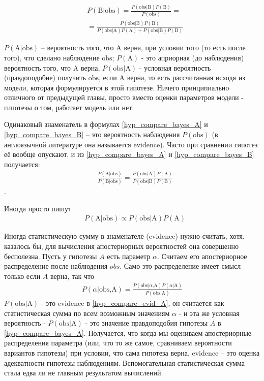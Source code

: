 \documentclass{book}
\begin{document}
\begin{align}\label{hyp_compare_bayes_B}
   &P\left(\text{B|obs}\right)=
   \frac{P\left(\text{obs|B}\right) P\left(\text{B}\right)}{P\left(\text{obs}\right)} = \nonumber \\
   &=\frac{P\left(\text{obs|B}\right) P\left(\text{B}\right)}{P\left(\text{obs|A}\right) P\left(\text{A}\right)+P\left(\text{obs|B}\right) P\left(\text{B}\right)}
\end{align}


$P\left(\text{A|obs}\right)$ -- вероятность того, что $\text{A}$ верна, при условии того (то есть после того), что сделано наблюдение $\text{obs}$; $P\left(\text{A}\right)$ - это априорная (до наблюдения) вероятность того, что $\text{A}$ верна, $P\left(\text{obs|A}\right)$ - условная вероятность (правдоподобие) получить $\text{obs}$, если $\text{A}$ верна, то есть рассчитанная исходя из модели, которая формулируется в этой гипотезе. Ничего принципиально отличного от предыдущей главы, просто вместо оценки параметров модели - гипотезы о том, работает модель или нет.

Одинаковый знаменатель в формулах \eqref{hyp_compare_bayes_A} и \eqref{hyp_compare_bayes_B} -- это вероятность наблюдения $P\left(\text{obs}\right)$ (в англоязычной литературе она называется evidence). Часто при сравнении гипотез её вообще опускают, и из \eqref{hyp_compare_bayes_A} и \eqref{hyp_compare_bayes_B} получается:
\begin{align}\label{hyp_compare_bayes_comp}
   &\frac{P\left(\text{A|obs}\right)}{P\left(\text{B|obs}\right)}=\frac{P\left(\text{obs|A}\right) P\left(\text{A}\right)}{P\left(\text{obs|B}\right) P\left(\text{B}\right)}
\end{align}.

Иногда просто пишут 
\begin{align}\label{hyp_compare_bayes_null_prop}
   &P\left(\text{A|obs}\right)\propto P\left(\text{obs|A}\right) P\left(\text{A}\right)
\end{align}

Иногда \cite{skilling_nested_2006} статистическую сумму в знаменателе (evidence) нужно считать, хотя, казалось бы, для вычисления апостериорных вероятностей она совершенно бесполезна. Пусть у гипотезы $A$ есть параметр $\alpha$. Считаем его апостериорное распределение после наблюдения $obs$. Само это распределение имеет смысл только если $A$ верна, так что 
\begin{align}\label{hyp_compare_evid_A}
   P\left(\alpha\text{|obs,A}\right)=\frac{P\left(\text{obs|}\alpha\text{,A}\right) P\left(\alpha\text{|A}\right)}{P\left(\text{obs|A}\right)}
\end{align}
$P\left(\text{obs|A}\right)$ - это evidence в \eqref{hyp_compare_evid_A}, он считается как статистическая сумма по всем возможным значениям $\alpha$ - и эта же условная вероятность - $P\left(\text{obs|A}\right)$ - это значение правдоподобия гипотезы $A$ в  \eqref{hyp_compare_bayes_A}. Получается, что когда мы оцениваем апостериорные распределения параметра (или, что то же самое, сравниваем вероятности вариантов гипотезы) при условии, что сама гипотеза верна, evidence -- это оценка адекватности гипотезы наблюдениям. Вспомогательная статистическая сумма стала едва ли не главным результатом вычислений.
\end{document}
